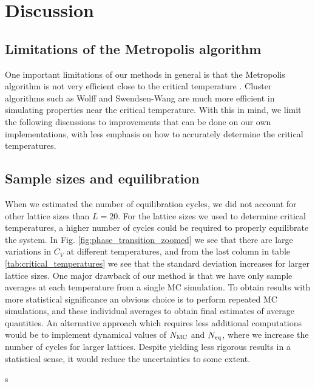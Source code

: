 \section{Discussion}\label{sec:discussion}
\subsection{Limitations of the Metropolis algorithm}\label{subsec_discussion:limitations}
One important limitations of our methods in general is that the Metropolis algorithm is not very efficient close to the critical temperature \cite{lecture_notes}. Cluster algorithms such as Wolff and Swendsen-Wang are much more efficient in simulating properties near the critical temperature. With this in mind, we limit the following discussions to improvements that can be done on our own implementations, with less emphasis on how to accurately determine the critical temperatures. 

\subsection{Sample sizes and equilibration}\label{subsec_discussion:sample_size_equi}
When we estimated the number of equilibration cycles, we did not account for other lattice sizes than $L=20$. For the lattice sizes we used to determine critical temperatures, a higher number of cycles could be required to properly equilibrate the system. In Fig. \ref{fig:phase_transition_zoomed} we see that there are large variations in $C_V$ at different temperatures, and from the last column in table \ref{tab:critical_temperatures} we see that the standard deviation increases for larger lattice sizes. One major drawback of our method is that we have only sample averages at each temperature from a single MC simulation. To obtain results with more statistical significance an obvious choice is to perform repeated MC simulations, and these individual averages to obtain final estimates of average quantities. An alternative approach which requires less additional computations would be to implement dynamical values of $N_\mathrm{MC}$ and $N_\mathrm{eq}$, where we increase the number of cycles for larger lattices. Despite yielding less rigorous results in a statistical sense, it would reduce the uncertainties to some extent.  

s

